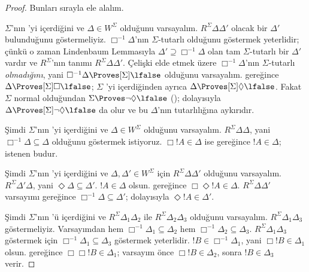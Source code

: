 \documentclass[../../../include/open-logic-section]{subfiles}
\begin{document}
\begin{proof}
  Bunları sırayla ele alalım.

  $\Sigma$'nın 'yi içerdiğini ve $\Delta\in W^\Sigma$ olduğunu
  varsayalım. $R^\Sigma\Delta\Delta'$ olacak bir $\Delta'$ bulunduğunu
  göstermeliyiz. $\Box^{-1}\Delta$'nın $\Sigma$-tutarlı olduğunu göstermek
  yeterlidir; çünkü o zaman Lindenbaum Lemmasıyla
  $\Delta'\supseteq\Box^{-1}\Delta$ olan tam $\Sigma$-tutarlı bir $\Delta'$
  vardır ve $R^\Sigma$'nın tanımı
  $R^\Sigma\Delta\Delta'$. Çelişki elde etmek üzere
  $\Box^{-1}\Delta$'nın $\Sigma$-tutarlı \emph{olmadığını}, yani
  $\Box^{-1}\Delta\Proves[\Sigma]\lfalse$ olduğunu varsayalım.
   gereğince
  $\Delta\Proves[\Sigma]\Box\lfalse$; $\Sigma$ 'yi içerdiğinden
  ayrıca $\Delta\Proves[\Sigma]\Diamond\lfalse$. Fakat $\Sigma$ normal
  olduğundan $\Sigma\Proves\lnot\Diamond\lfalse$
  (); dolayısıyla
  $\Delta\Proves[\Sigma]\lnot\Diamond\lfalse$ da olur ve bu
  $\Delta$'nın tutarlılığına aykırıdır.

  Şimdi $\Sigma$'nın 'yi içerdiğini ve $\Delta\in W^\Sigma$
  olduğunu varsayalım. $R^\Sigma\Delta\Delta$, yani
  $\Box^{-1}\Delta\subseteq\Delta$ olduğunu göstermek istiyoruz.
  $\Box!A\in\Delta$ ise  gereğince $!A\in\Delta$; istenen budur.

  Şimdi $\Sigma$'nın 'yi içerdiğini ve $\Delta,\Delta'\in W^\Sigma$
  için $R^\Sigma\Delta\Delta'$ olduğunu varsayalım.
  $R^\Sigma\Delta'\Delta$, yani
  $\Diamond\Delta\subseteq\Delta'$. $!A\in\Delta$ olsun. 
  gereğince $\Box\Diamond!A\in\Delta$. $R^\Sigma\Delta\Delta'$
  varsayımı 
  gereğince $\Box^{-1}\Delta\subseteq\Delta'$; dolayısıyla
  $\Diamond!A\in\Delta'$.

  Şimdi $\Sigma$'nın 'ü içerdiğini ve
  $R^\Sigma\Delta_1\Delta_2$ ile $R^\Sigma\Delta_2\Delta_3$ olduğunu
  varsayalım. $R^\Sigma\Delta_1\Delta_3$ göstermeliyiz. Varsayımdan
   hem
  $\Box^{-1}\Delta_1\subseteq\Delta_2$ hem
  $\Box^{-1}\Delta_2\subseteq\Delta_3$. $R^\Sigma\Delta_1\Delta_3$
  göstermek için $\Box^{-1}\Delta_1\subseteq\Delta_3$ göstermek yeterlidir.
  $!B\in\Box^{-1}\Delta_1$, yani $\Box!B\in\Delta_1$ olsun. 
  gereğince $\Box\Box!B\in\Delta_1$; varsayım önce
  $\Box!B\in\Delta_2$, sonra $!B\in\Delta_3$ verir.


\end{proof}
\end{document}
